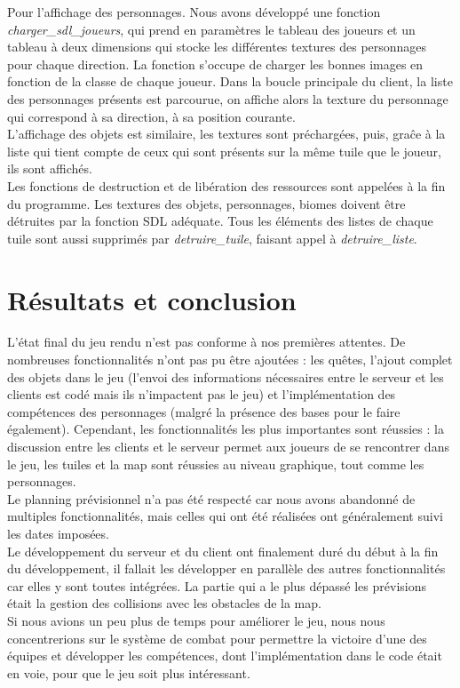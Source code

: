 \documentclass[11pt]{article}
\begin{document}
            Pour l’affichage des personnages. Nous avons développé une fonction \textit{charger\_sdl\_joueurs}, qui prend en paramètres le tableau des joueurs et un tableau 
            à deux dimensions qui stocke les différentes textures des personnages pour chaque direction. La fonction s’occupe de charger les bonnes images en fonction de la classe de chaque joueur. 
            Dans la boucle principale du client, la liste des personnages présents est parcourue, on affiche alors la texture du personnage qui correspond à sa direction, 
            à sa position courante.\\
            L’affichage des objets est similaire, les textures sont préchargées, puis, graĉe à la liste qui tient compte de ceux qui sont présents sur la même tuile 
            que le joueur, ils sont affichés.\\
            Les fonctions de destruction et de libération des ressources sont appelées à la fin du programme. 
            Les textures des objets, personnages, biomes doivent être détruites par la fonction SDL adéquate. 
            Tous les éléments des listes de chaque tuile sont aussi supprimés par \textit{detruire\_tuile}, faisant appel à \textit{detruire\_liste}.

                
    \section{Résultats et conclusion}
    L’état final du jeu rendu n’est pas conforme à nos premières attentes. De nombreuses fonctionnalités n’ont pas pu être ajoutées : les quêtes, l’ajout complet des objets dans le jeu (l’envoi des informations nécessaires entre le serveur et les clients est codé mais ils n’impactent pas le jeu) et l’implémentation des compétences des personnages (malgré la présence des bases pour le faire également). Cependant, les fonctionnalités les plus importantes sont réussies : la discussion entre les clients et le serveur permet aux joueurs de se rencontrer dans le jeu, les tuiles et la map sont réussies au niveau graphique, tout comme les personnages.\\
    Le planning prévisionnel n’a pas été respecté car nous avons abandonné de multiples fonctionnalités, mais celles qui ont été réalisées ont généralement suivi les dates imposées.\\
    Le développement du serveur et du client ont finalement duré du début à la fin du développement, il fallait les développer en parallèle des autres fonctionnalités car elles y sont toutes intégrées. La partie qui a le plus dépassé les prévisions était la gestion des collisions avec les obstacles de la map.\\
    Si nous avions un peu plus de temps pour améliorer le jeu, nous nous concentrerions sur le système de combat pour permettre la victoire d’une des équipes et développer les compétences, dont l’implémentation dans le code était en voie, pour que le jeu soit plus intéressant.
    
\end{document}
